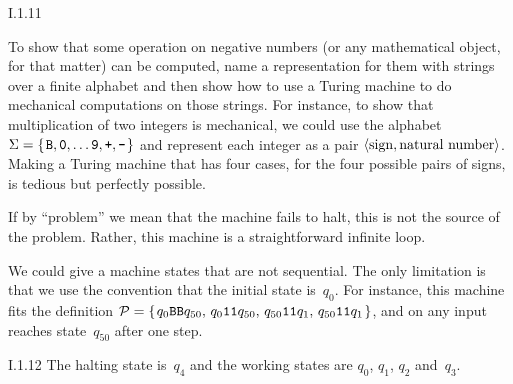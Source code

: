 %
\begin{ans}{I.1.11}
\begin{exparts}
\item To show that some operation on negative numbers (or any mathematical
object, for that matter) can be computed, name a representation for them
with strings over a finite alphabet
and then show how to use a Turing machine to do mechanical computations
on those strings.
For instance, to show that multiplication of two integers is mechanical,
we could use the alphabet
$\Sigma=\set{\str{B},\str{0},\ldots \str{9},\str{+},\str{-}}$ and
represent each integer as a pair
$\langle\text{sign},\text{natural number}\rangle$.
Making a Turing machine that has four cases, for the four possible pairs of
signs, is tedious but perfectly possible.
\item If by ``problem'' we mean that the machine fails to halt, this is not
the source of the problem.
Rather, this machine is a straightforward infinite loop.
\item We could give a machine states that are not sequential.
The only limitation is that we use the convention that the initial state
is~$q_0$.
For instance, this machine fits the definition
$\TM=\set{\tminstruction{0}{B}{B}{50},\,
  \tminstruction{0}{1}{1}{50},\,
  \tminstruction{50}{1}{1}{1},\,
  \tminstruction{50}{1}{1}{1}}$,
and on any input reaches state~$q_{50}$ after one step.
\end{exparts}
\end{ans}
%
\begin{ans}{I.1.12}
The halting state is~$q_4$ and the working states are
$q_0$, $q_1$, $q_2$ and~$q_3$.
\end{ans}
%
